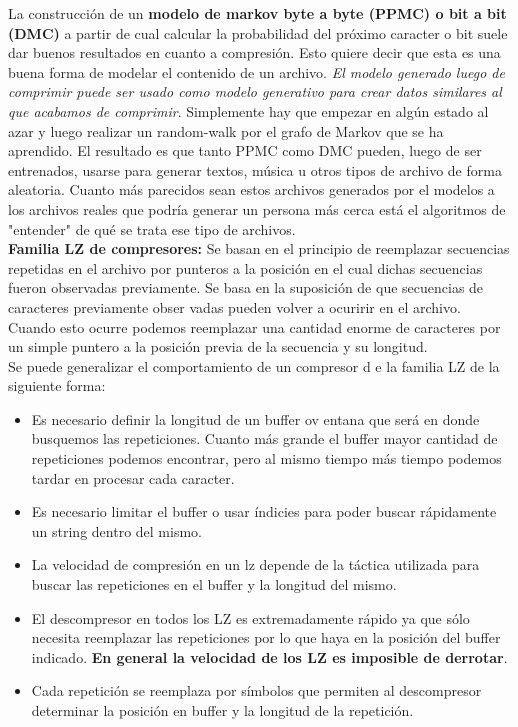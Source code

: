 \documentclass[titlepage,a4paper]{article}
\begin{document}
La construcción de un \textbf{modelo de markov byte a byte (PPMC) o bit a bit (DMC)} a partir de cual calcular la probabilidad del próximo caracter o bit  suele dar buenos resultados en cuanto a compresión. Esto quiere decir que esta es una buena forma de modelar el contenido de un archivo. \textit{El modelo generado luego de comprimir puede ser usado como modelo generativo para crear datos similares al que acabamos de comprimir}. Simplemente hay que empezar en algún estado al azar y luego realizar un random-walk por el grafo de Markov que se ha aprendido. El resultado es que tanto PPMC como DMC pueden, luego de ser entrenados, usarse para generar textos, música u otros tipos de archivo de forma aleatoria. Cuanto más parecidos sean estos archivos generados por el modelos a los archivos reales que podría generar un persona más cerca está el algoritmos de "entender" de qué se trata ese tipo de archivos. \\

\textbf{Familia LZ de compresores: }
Se basan en el principio de reemplazar secuencias repetidas en el archivo por punteros a la posición en el cual dichas secuencias fueron observadas previamente. Se basa en la suposición de que secuencias de caracteres previamente obser vadas pueden volver a ocuririr en el archivo. Cuando esto ocurre podemos reemplazar una cantidad enorme de caracteres por un simple puntero a la posición previa de la secuencia y su longitud. \\

Se puede generalizar el comportamiento de un compresor d e la familia LZ de la siguiente forma: \\
\begin{itemize}
\item Es necesario definir la longitud de un buffer ov entana que será en donde busquemos las repeticiones. Cuanto más grande el buffer mayor cantidad de repeticiones podemos encontrar, pero al mismo tiempo más tiempo podemos tardar en procesar cada caracter. 
\item Es necesario limitar el buffer o usar índicies para poder buscar rápidamente un string dentro del mismo. 
\item La velocidad de compresión en un lz depende de la táctica utilizada para buscar las repeticiones en el buffer y la longitud del mismo. 
\item El descompresor en todos los LZ es extremadamente rápido ya que sólo necesita reemplazar  las repeticiones por lo que haya en la posición del buffer indicado. \textbf{En general la velocidad de los LZ es imposible de derrotar}.
\item Cada repetición se reemplaza por símbolos que permiten al descompresor determinar la posición en buffer y la longitud de la repetición. 
\end{itemize}
\end{document}
